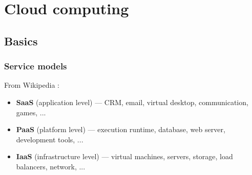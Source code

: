 \documentclass[oneside]{book}
\begin{document}
\section{Cloud computing}

\subsection{Basics}

\subsubsection{Service models}

From Wikipedia \cite{wikipedia_cloud_computing}:
\begin{itemize}
	\item \textbf{SaaS} (application level) --- CRM, email, virtual desktop, communication, games, ...
	\item \textbf{PaaS} (platform level) --- execution runtime, database, web server, development tools, ...
	\item \textbf{IaaS} (infrastructure level) --- virtual machines, servers, storage, load balancers, network, ...
\end{itemize}

\printbibliography
\end{document}
